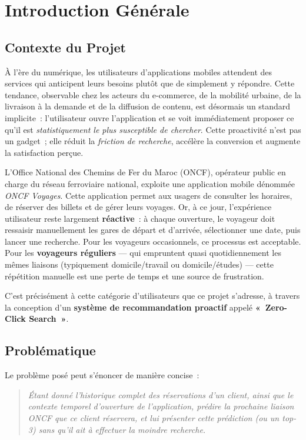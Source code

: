 \documentclass[11pt, a4paper]{article}
\begin{document}
\section{Introduction Générale}

\subsection{Contexte du Projet}

À l'ère du numérique, les utilisateurs d'applications mobiles attendent
des services qui anticipent leurs besoins plutôt que de simplement y
répondre. Cette tendance, observable chez les acteurs du e-commerce,
de la mobilité urbaine, de la livraison à la demande et de la diffusion
de contenu, est désormais un standard implicite~: l'utilisateur ouvre
l'application et se voit immédiatement proposer ce qu'il est
\textit{statistiquement le plus susceptible de chercher}. Cette
proactivité n'est pas un gadget~; elle réduit la \textit{friction de
recherche}, accélère la conversion et augmente la satisfaction perçue.

L'Office National des Chemins de Fer du Maroc (ONCF), opérateur public
en charge du réseau ferroviaire national, exploite une application
mobile dénommée \textit{ONCF Voyages}. Cette application permet aux
usagers de consulter les horaires, de réserver des billets et de gérer
leurs voyages. Or, à ce jour, l'expérience utilisateur reste largement
\textbf{réactive}~: à chaque ouverture, le voyageur doit ressaisir
manuellement les gares de départ et d'arrivée, sélectionner une date,
puis lancer une recherche. Pour les voyageurs occasionnels, ce processus
est acceptable. Pour les \textbf{voyageurs réguliers} --- qui empruntent
quasi quotidiennement les mêmes liaisons (typiquement domicile/travail
ou domicile/études) --- cette répétition manuelle est une perte de
temps et une source de frustration.

C'est précisément à cette catégorie d'utilisateurs que ce projet
s'adresse, à travers la conception d'un \textbf{système de
recommandation proactif} appelé \textbf{«~Zero-Click Search~»}.

\subsection{Problématique}

Le problème posé peut s'énoncer de manière concise~:
\begin{quote}
\textit{Étant donné l'historique complet des réservations d'un client,
ainsi que le contexte temporel d'ouverture de l'application, prédire la
prochaine liaison ONCF que ce client réservera, et lui présenter cette
prédiction (ou un top-3) sans qu'il ait à effectuer la moindre
recherche.}
\end{quote}
\end{document}
